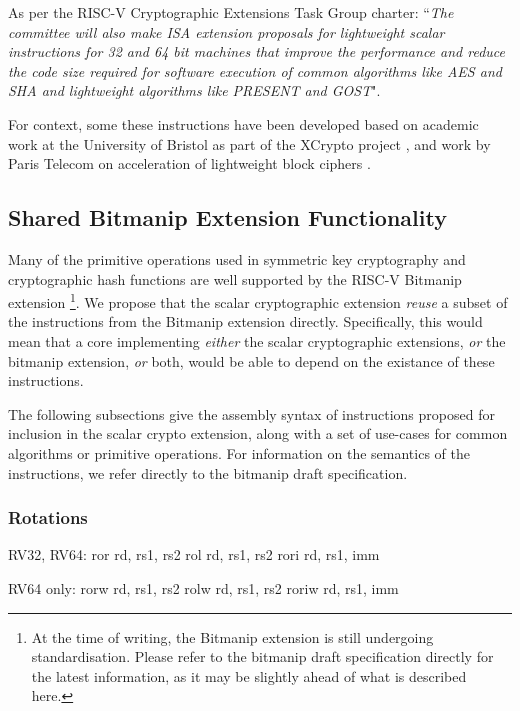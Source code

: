 
As per the RISC-V Cryptographic Extensions Task Group charter:
``{\em The committee will also make ISA extension proposals for lightweight
scalar instructions for 32 and 64 bit machines that improve the performance
and reduce the code size required for software execution of common algorithms
like AES and SHA and lightweight algorithms like PRESENT and GOST}".

\bigskip

For context, some these instructions have been developed based on academic
work at the University of Bristol as part of the XCrypto project
\cite{MPP:19},
and work by
Paris Telecom on acceleration of lightweight block ciphers
\cite{TGMGD:19}.


\subsection{Shared Bitmanip Extension Functionality}

Many of the primitive operations used in symmetric key cryptography
and cryptographic hash functions are well supported by the
RISC-V Bitmanip \cite{riscv:bitmanip:repo} extension
\footnote{
At the time of writing, the Bitmanip extension is still undergoing
standardisation.
Please refer to the bitmanip draft specification
\cite{riscv:bitmanip:draft}
directly for the
latest information, as it may be slightly ahead of what is described
here.
}.
We propose that the scalar cryptographic extension {\em reuse} a
subset of the instructions from the Bitmanip extension directly.
Specifically, this would mean that
a core implementing
{\em either}
the scalar cryptographic extensions,
{\em or}
the bitmanip extension,
{\em or}
both,
would be able to depend on the existance of these instructions.

The following subsections give the assembly syntax of instructions
proposed for inclusion in the scalar crypto extension, along with a
set of use-cases for common algorithms or primitive operations.
For information on the semantics of the instructions, we refer directly
to the bitmanip draft specification.

\subsubsection{Rotations}

\begin{isa}
RV32, RV64:
    ror    rd, rs1, rs2
    rol    rd, rs1, rs2
    rori   rd, rs1, imm

RV64 only:
    rorw   rd, rs1, rs2
    rolw   rd, rs1, rs2
    roriw  rd, rs1, imm
\end{isa}

